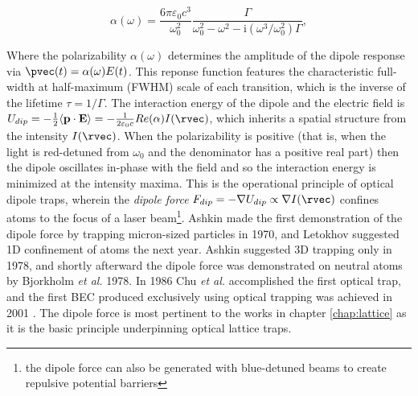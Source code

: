 	\begin{equation}
		\alpha(\omega) = \frac{6\pi\varepsilon_0c^3}{\omega_0^2}\frac{\Gamma}{\omega_0^2-\omega^2-\textrm{i}(\omega^3/\omega_0^2)\Gamma},
	\end{equation}

	Where the polarizability $\alpha(\omega)$ determines the amplitude of the dipole response via $\pvec(t) = \alpha(\omega)E(t)$. This reponse function features the characteristic full-width at half-maximum (FWHM) scale of each transition, which is the inverse of the lifetime $\tau=1/\Gamma$. The interaction energy of the dipole and the electric field is $U_{dip} = -\frac{1}{2}\langle\textbf{p}\cdot\textbf{E}\rangle = -\frac{1}{2\varepsilon_0 c}Re(\alpha)I(\rvec)$, which inherits a spatial structure from the intensity $I(\rvec)$. When the polarizability is positive (that is, when the light is red-detuned from $\omega_0$ and the denominator has a positive real part) then the dipole oscillates in-phase with the field and so the interaction energy is minimized at the intensity maxima. This is the operational principle of optical dipole traps, wherein the \emph{dipole force} $F_{dip} = -\nabla U_{dip} \propto \nabla I(\rvec)$ confines atoms to the focus of a laser beam\footnote{the dipole force can also be generated with blue-detuned beams to create repulsive potential barriers}. Ashkin made the first demonstration of the dipole force by trapping micron-sized particles in 1970, and Letokhov suggested 1D confinement of atoms the next year. Ashkin suggested 3D trapping only in 1978, and shortly afterward the dipole force was demonstrated on neutral atoms by Bjorkholm \emph{et al.} 1978. In 1986 Chu \emph{et al.} accomplished the first optical trap, and the first BEC produced exclusively using optical trapping was achieved in 2001 \cite{barrett01}. The dipole force is most pertinent to the works in chapter \ref{chap:lattice} as it is the basic principle underpinning optical lattice traps. 

